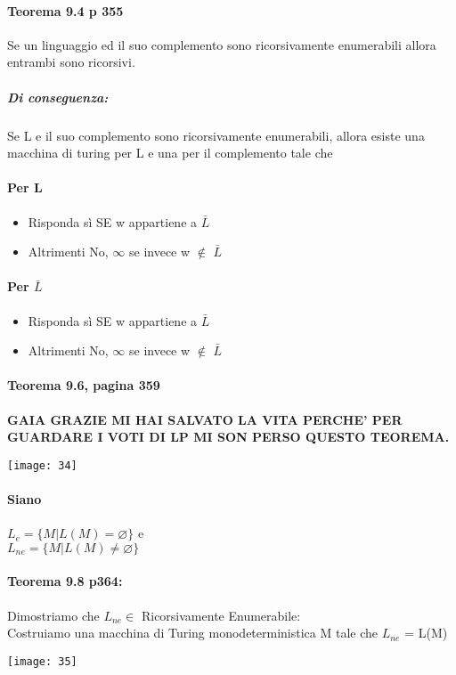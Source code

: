 \documentclass[12pt, a4paper, openany, oneside]{book}
\begin{document}
\paragraph{Teorema 9.4 p 355} Se un linguaggio ed il suo complemento sono 
ricorsivamente enumerabili allora entrambi sono ricorsivi.
\subparagraph{Di conseguenza: }Se L e il suo complemento sono ricorsivamente
enumerabili, allora esiste una macchina di turing per L e una per il complemento
tale che
\paragraph{Per L}
\begin{itemize}
		\item Risponda sì SE w appartiene a $\bar{L}$
		\item Altrimenti No, $\infty$ se invece w $\notin$  $\bar{L}$
	\end{itemize}	
\paragraph{Per $\bar{L}$}
\begin{itemize}
		\item Risponda sì SE w appartiene a $\bar{L}$
		\item Altrimenti No, $\infty$ se invece w $\notin$  $\bar{L}$
\end{itemize}	
\paragraph{Teorema 9.6, pagina 359}
\textbf{GAIA GRAZIE MI HAI SALVATO LA VITA PERCHE' PER GUARDARE I VOTI DI LP
MI SON PERSO QUESTO TEOREMA.}
\begin{center}
\texttt{[image: 34]}
\end{center}
\paragraph{Siano} $L_{e} = \{M | L(M) = \varnothing\}$ e\\
$L_{ne} = \{M | L(M) \neq \varnothing\}$

\paragraph{Teorema 9.8 p364:} Dimostriamo che $L_{ne} \in$ Ricorsivamente Enumerabile:\\
Costruiamo una macchina di Turing monodeterministica M tale che $L_{ne}$ = L(M)
\begin{center}
\texttt{[image: 35]}
\end{center}
\end{document}
